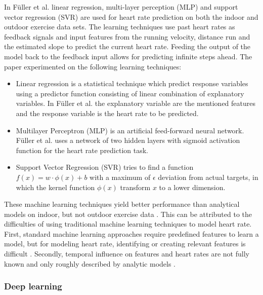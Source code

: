 \documentclass[12pt]{article}
\begin{document}
        In F{\"u}ller et al. \cite{Fueller15} linear regression, multi-layer perception (MLP) and support vector regression (SVR) are used for heart rate prediction on both the indoor and outdoor exercise data sets. The learning techniques use past heart rates as feedback signals and input features from the running velocity, distance run and the estimated slope to predict the current heart rate. Feeding the output of the model back to the feedback input allows for predicting infinite steps ahead. The paper experimented on the following learning techniques:
        \begin{itemize}[label={--}]
            \item Linear regression \cite{SEAL01121977} is a statistical technique which predict response variables using a predictor function consisting of linear combination of explanatory variables. In F{\"u}ller et al. the explanatory variable are the mentioned features and the response variable is the heart rate to be predicted.
            \item Multilayer Perceptron (MLP) \cite{VanDerMalsburg1986} is an artificial feed-forward neural network. F{\"u}ller et al. \cite{Fueller15} uses a network of two hidden layers with sigmoid activation function for the heart rate prediction task.
            \item Support Vector Regression (SVR) \cite{Vapnik:1995:NSL:211359} tries to find a function $f(x) = w \cdot \phi(x) + b$ with a maximum of $\epsilon$ deviation from actual targets, in which the kernel function $\phi(x)$ transform $x$ to a lower dimension.
            \end{itemize}

        These machine learning techniques yield better performance than analytical models on indoor, but not outdoor exercise data \cite{Fueller15}. This can be attributed to the difficulties of using traditional  machine learning techniques to model heart rate. First, standard machine learning approaches require predefined features to learn a model, but for modeling heart rate, identifying or creating relevant features is difficult \cite{Xiao10HeartEvol}. Secondly, temporal influence on features and heart rates are not fully known and only roughly described by analytic models \cite{Fueller15}.

        \subsubsection{Deep learning}
\end{document}
